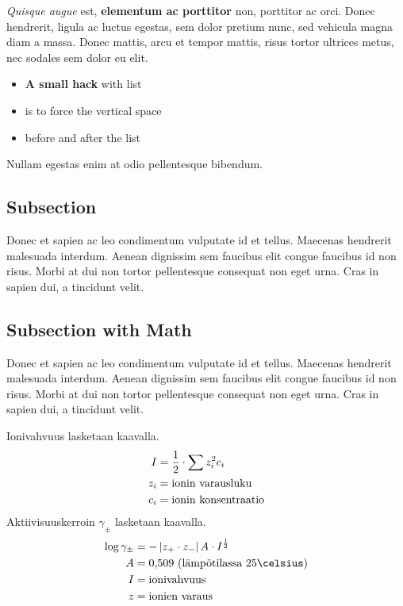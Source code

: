 \documentclass[11pt,a4paper,oneside,article]{memoir}
\begin{document}
\textit{Quisque augue} est, \textbf{elementum ac porttitor} non, porttitor ac orci. Donec hendrerit, ligula ac luctus egestas, sem dolor pretium nunc, sed vehicula magna diam a massa. Donec mattis, arcu et tempor mattis, risus tortor ultrices metus, nec sodales sem dolor eu elit.\vspace{-17pt} 
\begin{itemize}
\item \textbf{A small hack} with list
\item is to force the vertical space 
\item before and after the list
\end{itemize}
\vspace{-17pt} Nullam egestas enim at odio pellentesque bibendum. 

\subsection{Subsection}
Donec et sapien ac leo condimentum vulputate id et tellus. Maecenas hendrerit malesuada interdum. Aenean dignissim sem faucibus elit congue faucibus id non risus. Morbi at dui non tortor pellentesque consequat non eget urna. Cras in sapien dui, a tincidunt velit.

\subsection{Subsection with Math}
Donec et sapien ac leo condimentum vulputate id et tellus. Maecenas hendrerit malesuada interdum. Aenean dignissim sem faucibus elit congue faucibus id non risus. Morbi at dui non tortor pellentesque consequat non eget urna. Cras in sapien dui, a tincidunt velit.

Ionivahvuus lasketaan kaavalla.
\begin{align}
I&=\frac{1}{2}\cdot\sum z_i^2c_i \\
z_i&= \textnormal{ionin varausluku} \\
c_i&= \textnormal{ionin konsentraatio}
\end{align}
Aktiivisuuskerroin $\gamma_\pm$ lasketaan kaavalla.
\begin{align}
\log \gamma_\pm &= -\left|z_+\cdot z_-\right|A\cdot I^{\frac{1}{2}} \\
A &= \tn{0,509 (lämpötilassa 25\celsius}) \\
I &= \tn{ionivahvuus} \\
z &= \tn{ionien varaus}
\end{align}
\end{document}
